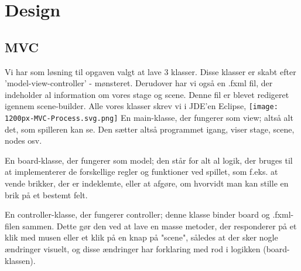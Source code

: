 \usepackage{graphicx}
\graphicspath{{./Downloads/}}
\section{Design}
\subsection{MVC}\label{MVC}
Vi har som løsning til opgaven valgt at lave 3 klasser. Disse klasser er skabt efter 'model-view-controller' - mønsteret. Derudover har vi også en .fxml fil, der indeholder al information om vores stage og scene. Denne fil er blevet redigeret igennem scene-builder. Alle vores klasser skrev vi i JDE'en Eclipse, 
\texttt{[image: 1200px-MVC-Process.svg.png]}
En main-klasse, der fungerer som view; altså alt det, som spilleren kan se. Den sætter altså programmet igang, viser stage, scene, nodes osv. 

En board-klasse, der fungerer som model; den står for alt al logik, der bruges til at implementerer de forskellige regler og funktioner ved spillet, som f.eks. at vende brikker, der er indeklemte, eller at afgøre, om hvorvidt man kan stille en brik på et bestemt felt. 

En controller-klasse, der fungerer controller; denne klasse binder board og .fxml-filen sammen. Dette gør den ved at lave en masse metoder, der responderer på et klik med musen eller et klik på en knap på "scene", således at der sker nogle ændringer visuelt, og disse ændringer har forklaring med rod i logikken (board-klassen).